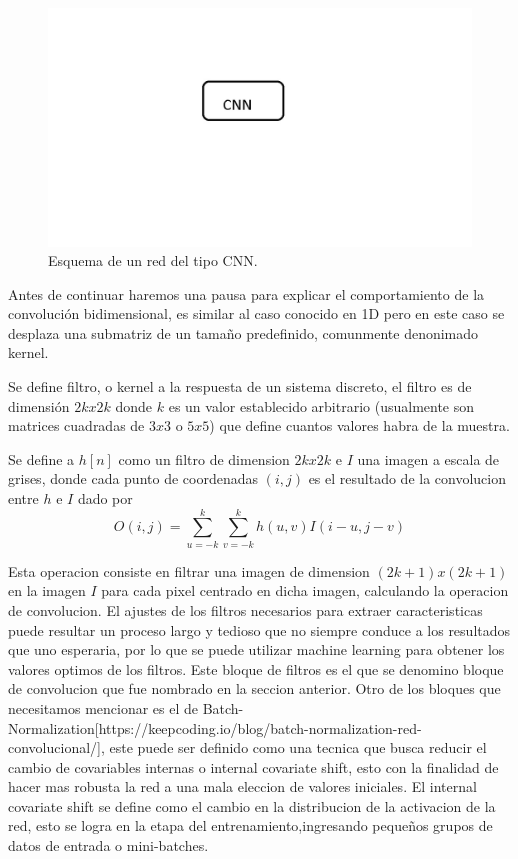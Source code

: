 \begin{figure}
    \centering
    \includegraphics[width=1\textwidth]{imgs/CNN-completa.jpg}
    \caption{Esquema de un red del tipo CNN.}
    \label{fig:esquema-CNN}
\end{figure}
Antes de continuar haremos una pausa para explicar el comportamiento de la convolución bidimensional, es similar al caso conocido en 1D pero
en este caso se desplaza una submatriz de un tamaño predefinido, comunmente denonimado kernel.

Se define filtro, o kernel a la respuesta de un sistema discreto, el filtro es de dimensión $2k x 2k$ donde $k$ es un
valor establecido arbitrario (usualmente son matrices cuadradas de $3x3$ o $5x5$) que define cuantos valores habra de la muestra.

Se define a $h[n]$ como un filtro de dimension $2k x 2k$ e $I$ una imagen a escala de grises, donde cada punto de coordenadas $(i,j)$ es el
resultado de la convolucion entre $h$ e $I$ dado por
\begin{equation}
    O(i,j)= \sum_{u=-k}^{k} \sum_{v=-k}^{k} h(u,v)I(i-u,j-v)
\end{equation}

Esta operacion consiste en filtrar una imagen de dimension $(2k+1)x(2k+1)$ en la imagen $I$ para cada pixel centrado en dicha imagen,
calculando la operacion de convolucion.
El ajustes de los filtros necesarios para extraer caracteristicas puede resultar un proceso largo y tedioso que no siempre conduce a los
resultados que uno esperaria, por lo que se puede utilizar machine learning para obtener los valores optimos de los filtros.
Este bloque de filtros es el que se denomino bloque de convolucion que fue nombrado en la seccion anterior.
Otro de los bloques que necesitamos mencionar es el de Batch-Normalization[https://keepcoding.io/blog/batch-normalization-red-convolucional/],
este puede ser definido como una tecnica que busca reducir el cambio de covariables internas o internal covariate shift, esto con la finalidad
de hacer mas robusta la red a una mala eleccion de valores iniciales. El internal covariate shift se define como el cambio en la distribucion de la activacion de la red,
esto se logra en la etapa del entrenamiento,ingresando pequeños grupos de datos de entrada o mini-batches.

